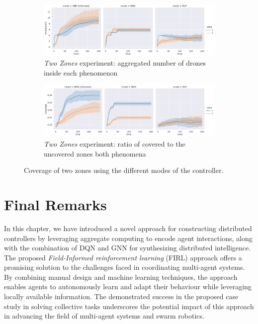 \begin{figure}
	\centering
  	\begin{subfigure}[b]{0.75\linewidth}
    \includegraphics[width=\linewidth]{papers/acsos2023/imgs/inside-two-test}
    \caption{\emph{Two Zones} experiment: aggregated number of drones inside each phenomenon}
    \label{acsos2023:fig:inside-two-test}
  \end{subfigure}
  \begin{subfigure}[b]{0.75\linewidth}
    \includegraphics[width=\linewidth]{papers/acsos2023/imgs/coverage-two-test}
    \caption{\emph{Two Zones} experiment: ratio of covered to the uncovered zones both phenomena}
    \label{acsos2023:fig:coverage-two-test}
  \end{subfigure} 
  \caption{Coverage of two zones using the different modes of the controller.}
  \label{acsos2023:fig:resCoverage}
\end{figure}

\section{Final Remarks}
\label{acsos2023:sec:conclusion}
In this chapter, 
 we have introduced a novel approach for constructing distributed controllers by leveraging aggregate computing to encode agent interactions, 
 along with the combination of \ac{DQN} and \ac{GNN} for synthesizing distributed intelligence.
The proposed \emph{Field-Informed reinforcement learning} (FIRL) approach offers a promising solution to the challenges faced in coordinating multi-agent systems. 
By combining manual design and machine learning techniques, 
 the approach enables agents to autonomously learn and adapt their behaviour while leveraging locally available information. 
%
The demonstrated success in the proposed case study in solving collective tasks underscores the potential impact of this approach in advancing the field of multi-agent systems and swarm robotics. 

